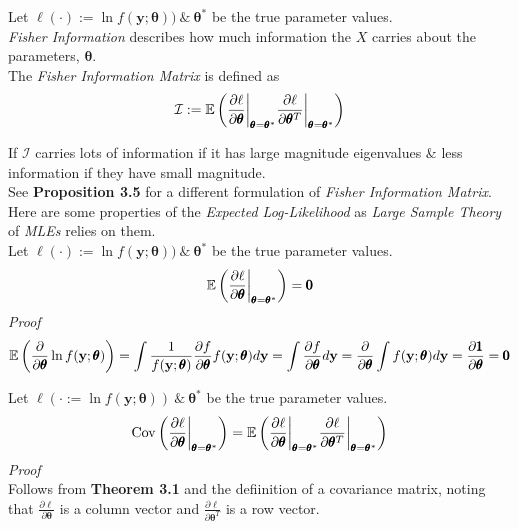 \documentclass[11pt,a4paper]{article}
\begin{document}

Let $\ell(\cdot):=\ln f(\textbf{y};\pmb\theta))\ \&\ \pmb\theta^*$ be the true parameter values.\\
\textit{Fisher Information} describes how much information the $X$ carries about the parameters, $\pmb\theta$.\\
The \textit{Fisher Information Matrix} is defined as
$$\mathcal{I}:=\mathbb{E}\left(\dfrac{\partial\ell}{\partial\pmb\theta}\bigg|_{\pmb\theta=\pmb\theta^*}\dfrac{\partial\ell}{\partial\pmb\theta^T}\bigg|_{\pmb\theta=\pmb\theta^*}\right)$$

If $\mathcal{I}$ carries lots of information if it has large magnitude eigenvalues \& less information if they have small magnitude.\\
\nb See \textbf{Proposition 3.5} for a different formulation of \textit{Fisher Information Matrix}.\\

Here are some properties of the \textit{Expected Log-Likelihood} as \textit{Large Sample Theory} of \textit{MLEs} relies on them.\\

Let $\ell(\cdot):=\ln f(\textbf{y};\pmb\theta))\ \&\ \pmb\theta^*$ be the true parameter values.
$$\mathbb{E}\left(\dfrac{\partial\ell}{\partial\pmb\theta}\bigg|_{\pmb\theta=\pmb\theta^*}\right)=\pmb0$$
\textit{Proof}
$$\mathbb{E}\left(\dfrac\partial{\partial\pmb\theta}\ln f(\textbf{y};\pmb\theta)\right)=\int\dfrac1{f(\textbf{y};\pmb\theta)}\dfrac{\partial f}{\partial\pmb\theta}f(\textbf{y};\pmb\theta)d\textbf{y}=\int\dfrac{\partial f}{\partial\pmb\theta}d\textbf{y}=\dfrac\partial{\partial\pmb\theta}\int f(\textbf{y};\pmb\theta)d\textbf{y}=\dfrac{\partial\pmb1}{\partial\pmb\theta}=\pmb0$$
\proved

Let $\ell(\cdot:=\ln f(\textbf{y};\pmb\theta))\ \&\ \pmb\theta^*$ be the true parameter values.
$$\mathrm{Cov}\left(\dfrac{\partial\ell}{\partial\pmb\theta}\bigg|_{\pmb\theta=\pmb\theta^*}\right)=\mathbb{E}\left(\dfrac{\partial\ell}{\partial\pmb\theta}\bigg|_{\pmb\theta=\pmb\theta^*}\dfrac{\partial\ell}{\partial\pmb\theta^T}\bigg|_{\pmb\theta=\pmb\theta^*}\right)$$
\textit{Proof}\\
Follows from \textbf{Theorem 3.1} and the defiinition of a covariance matrix, noting that $\frac{\partial\ell}{\partial\pmb\theta}$ is a column vector and $\frac{\partial\ell}{\partial\pmb\theta^T}$ is a row vector.\\
\end{document}
